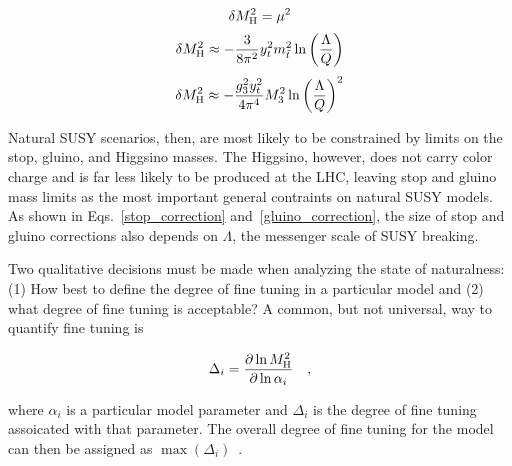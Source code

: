 \documentclass[12pt]{article}
\begin{document}
    \noindent \begin{equation}
        \delta M_{\mathrm{H}}^2 = \mu^2
        \label{higgsino_correction}
    \end{equation}
    \noindent \begin{equation}
        \delta M_{\mathrm{H}}^2 \approx - \frac{3}{8\pi^2} y_t^2 m_{\tilde{t}}^2 \ln{\left(\frac{\Lambda}{Q}\right)}
        \label{stop_correction}
    \end{equation}
    \noindent \begin{equation}
        \delta M_{\mathrm{H}}^2 \approx - \frac{g_3^2 y_t^2}{4\pi^4} M_3^2 \ln{\left(\frac{\Lambda}{Q}\right)}^2
        \label{gluino_correction}
    \end{equation}

    Natural SUSY scenarios, then, are most likely to be constrained by limits on the stop, gluino, and Higgsino masses. The Higgsino, however, does not carry color charge and is far less likely to be produced at the LHC, leaving stop and gluino mass limits as the most important general contraints on natural SUSY models. As shown in Eqs.~\ref{stop_correction} and~\ref{gluino_correction}, the size of stop and gluino corrections also depends on $\Lambda$, the messenger scale of SUSY breaking.

    Two qualitative decisions must be made when analyzing the state of naturalness: (1) How best to define the degree of fine tuning in a particular model and (2) what degree of fine tuning is acceptable? A common, but not universal, way to quantify fine tuning is
    
    \noindent \begin{equation}
        \Delta_i = \frac{\partial \ln{M_{\mathrm{H}}^2}}{\partial \ln{\alpha_i}} \quad ,
        \label{fine_tuning}
    \end{equation}

    \noindent where $\alpha_i$ is a particular model parameter and $\Delta_i$ is the degree of fine tuning assoicated with that parameter. The overall degree of fine tuning for the model can then be assigned as $\max{\left(\Delta_i\right)}$~\cite{cornering}.
\end{document}
